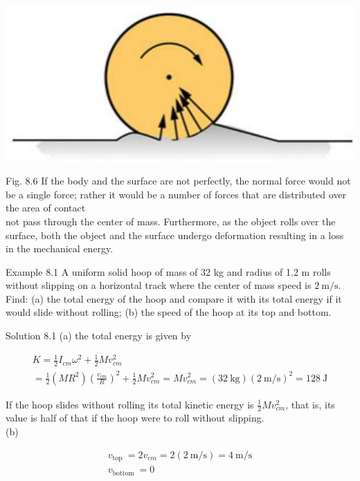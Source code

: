 \documentclass[10pt]{article}
\begin{document}
\begin{center}
\includegraphics[max width=\textwidth]{2024_09_13_db1f357d2aad0a03eb2eg-133(1)}
\end{center}

Fig. 8.6 If the body and the surface are not perfectly, the normal force would not be a single force; rather it would be a number of forces that are distributed over the area of contact\\
not pass through the center of mass. Furthermore, as the object rolls over the surface, both the object and the surface undergo deformation resulting in a loss in the mechanical energy.

Example 8.1 A uniform solid hoop of mass of 32 kg and radius of 1.2 m rolls without slipping on a horizontal track where the center of mass speed is $2 \mathrm{~m} / \mathrm{s}$. Find: (a) the total energy of the hoop and compare it with its total energy if it would slide without rolling; (b) the speed of the hoop at its top and bottom.

Solution 8.1 (a) the total energy is given by

$$
\begin{gathered}
K=\frac{1}{2} I_{c m} \omega^{2}+\frac{1}{2} M v_{c m}^{2} \\
=\frac{1}{2}\left(M R^{2}\right)\left(\frac{v_{c m}}{R}\right)^{2}+\frac{1}{2} M v_{c m}^{2}=M v_{c m}^{2}=(32 \mathrm{~kg})(2 \mathrm{~m} / \mathrm{s})^{2}=128 \mathrm{~J}
\end{gathered}
$$

If the hoop slides without rolling its total kinetic energy is $\frac{1}{2} M v_{c m}^{2}$, that is, its value is half of that if the hoop were to roll without slipping.\\
(b)

$$
\begin{gathered}
v_{\text {top }}=2 v_{c m}=2(2 \mathrm{~m} / \mathrm{s})=4 \mathrm{~m} / \mathrm{s} \\
v_{\text {bottom }}=0
\end{gathered}
$$
\end{document}
